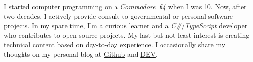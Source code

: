 \documentclass[10pt,a4paper]{article}
\begin{document}


\vspace{-1.3em}
\begin{multicols}{2}
    \noindent
    I started computer programming on a \textit{Commodore~64} when I was 10.
    Now, after two decades, I actively provide consult to governmental or
    personal software projects. In my spare time, I'm a curious learner and a
    \textit{C\#}/\textit{TypeScript} developer who contributes to open-source
    projects. My last but not least interest is creating technical content based
    on day-to-day experience. I occasionally share my thoughts on my personal
    blog at \href{https://babakks.github.io}{Github} and
    \href{https://dev.to/babakks}{DEV}.
\end{multicols}
\sectionrule{}
\end{document}
